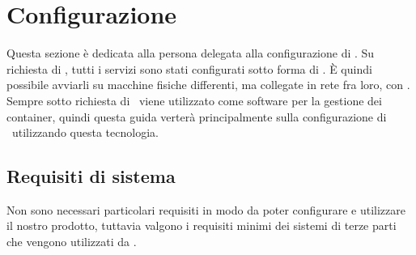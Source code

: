 \section{Configurazione}\label{configurazione}

Questa sezione è dedicata alla persona delegata alla configurazione di \progetto.
Su richiesta di \II, tutti i servizi sono stati configurati sotto forma di . È quindi possibile avviarli su macchine fisiche differenti, ma collegate in rete fra loro, con .\\
Sempre sotto richiesta di \II\ viene utilizzato  come software per la gestione dei container, quindi questa guida verterà principalmente sulla configurazione di \progetto\ utilizzando questa tecnologia.

\subsection{Requisiti di sistema}

	Non sono necessari particolari requisiti in modo da poter configurare e utilizzare il nostro prodotto, tuttavia valgono i requisiti minimi dei sistemi di terze parti che vengono utilizzati da \progetto.

